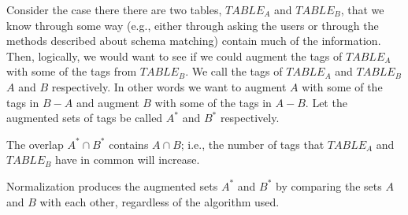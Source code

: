 Consider the case there there are two tables, $TABLE_A$ and $TABLE_B$, that we know through some way (e.g., either through asking the users or through the methods described about schema matching) contain much of the information. Then, logically, we would want to see if we could augment the tags of $TABLE_A$ with some of the tags from $TABLE_B$. We call the tags of $TABLE_A$ and $TABLE_B$ $A$ and $B$ respectively. In other words we want to augment $A$ with some of the tags in $B-A$ and augment $B$ with some of the tags in $A-B$. Let the augmented sets of tags be called $A^{*}$ and $B^{*}$ respectively.

The overlap $A^{*}\cap B^{*}$ contains $A\cap B$; i.e., the number of tags that $TABLE_A$ and $TABLE_B$ have in common will increase.

Normalization produces the augmented sets $A^{*}$ and $B^{*}$ by comparing the sets $A$ and $B$ with each other, regardless of the algorithm used.




